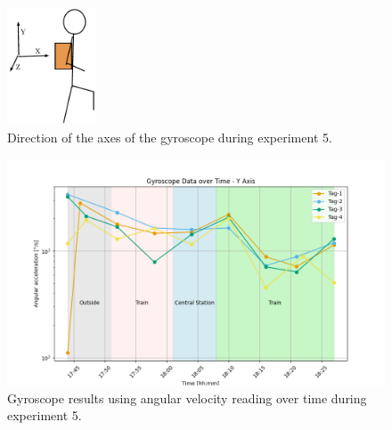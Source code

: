 \begin{figure}[ht!]
	\centering
	\includegraphics[width=100px]{graphics/schematics/gyro_walking.pdf}
	\caption{Direction of the axes of the gyroscope during experiment 5.}
	\label{f:ex5_train_gyro_y}
\end{figure}


\begin{figure}[ht!]
	\includegraphics[width=\linewidth]{graphics/exp/exp6_gyro_data_y_split_2.png}
	\caption{Gyroscope results using angular velocity reading over time during experiment 5.}
	\label{f:ex5_train_gyro_y}
\end{figure}

